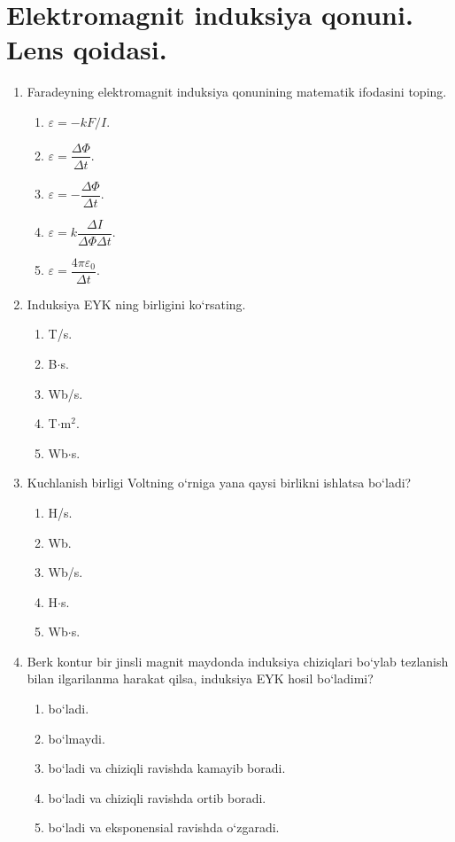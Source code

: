 \section{Elektromagnit induksiya qonuni.  Lens qoidasi.}





\begin{enumerate}

\item Faradeyning elektromagnit induksiya qonunining matematik ifodasini toping.
\begin{enumerate}[label=\Alph*)]
\item $\varepsilon=-kF/I$.
\item $\varepsilon=\dfrac{\Delta \Phi}{\Delta t}$.
\item $\varepsilon=-\dfrac{\Delta \Phi}{\Delta t}$.
\item $\varepsilon=k\dfrac{\Delta I}{\Delta \Phi \Delta t}$.
\item $\varepsilon=\dfrac{4\pi\varepsilon_0}{\Delta t}$.
\end{enumerate}

\item Induksiya EYK ning birligini ko‘rsating.
\begin{enumerate}[label=\Alph*)]
\item T/s.
\item B$\cdot$s.
\item Wb/s.
\item T$\cdot$m$^2$.
\item Wb$\cdot$s.
\end{enumerate}

\item Kuchlanish birligi Voltning o‘rniga yana qaysi birlikni ishlatsa bo‘ladi?
\begin{enumerate}[label=\Alph*)]
\item H/s.
\item Wb.
\item Wb/s.
\item H$\cdot$s.
\item Wb$\cdot$s.
\end{enumerate}

\item Berk kontur bir jinsli magnit maydonda induksiya chiziqlari bo‘ylab tezlanish bilan ilgarilanma harakat qilsa, induksiya EYK hosil bo‘ladimi?
\begin{enumerate}[label=\Alph*)]
\item bo‘ladi.
\item bo‘lmaydi.
\item bo‘ladi va chiziqli ravishda kamayib boradi.
\item bo‘ladi va chiziqli ravishda ortib boradi.
\item bo‘ladi va eksponensial ravishda o‘zgaradi.
\end{enumerate}


\end{enumerate}
